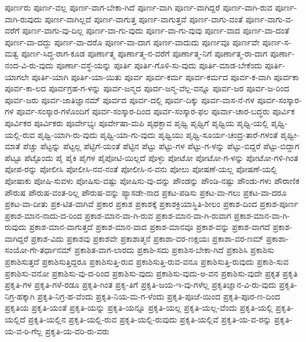 {ಪೂರ್ಣರು
ಪೂರ್ಣ-ವಲ್ಲ
ಪೂರ್ಣ-ವಾಗ-ಬೇಕಾ-ಗಿದೆ
ಪೂರ್ಣ-ವಾಗಿ
ಪೂರ್ಣ-ವಾಗಿದ್ದರೆ
ಪೂರ್ಣ-ವಾಗಿ-ರುವ
ಪೂರ್ಣ-ವಾಗಿ-ರುವುದು
ಪೂರ್ಣ-ವಾಗಿಲ್ಲದೆ
ಪೂರ್ಣ-ವಾಗುತ್ತ
ಪೂರ್ಣ-ವಾಗುತ್ತವೆ
ಪೂರ್ಣ-ವಾಗು-ವಂತೆ
ಪೂರ್ಣ-ವಾಗು-ವ-ವರೆಗೆ
ಪೂರ್ಣ-ವಾಗು-ವು-ದಿಲ್ಲ
ಪೂರ್ಣ-ವಾ-ಗು-ವುದು
ಪೂರ್ಣ-ವಾ-ಗು-ವುವು
ಪೂರ್ಣ-ವಾದ
ಪೂರ್ಣ-ವಾ-ದಂತೆ
ಪೂರ್ಣ-ವಾ-ದದ್ದು
ಪೂರ್ಣ-ವಾ-ದರೊ
ಪೂರ್ಣ-ವಾ-ದಾಗ
ಪೂರ್ಣ-ವಾದುದು
ಪೂರ್ಣವೂ
ಪೂರ್ಣವೇ
ಪೂರ್ಣ-ಸ-ಮತ್ವ
ಪೂರ್ಣ-ಸಿದ್ಧ-ರಾಗ-ಕೂಡ
ಪೂರ್ಣಾತ್ಮ
ಪೂರ್ಣಾತ್ಮ-ನ-ವರೆಗೆ
ಪೂರ್ಣಾತ್ಮ-ನಿಗೆ
ಪೂರ್ಣಾತ್ಮ-ರಾ-ದಾಗ
ಪೂರ್ಣಾ-ನಂದ-ವಿ-ರು-ವುದು
ಪೂರ್ಣಾ-ವಸ್ಥೆ-ಯನ್ನು
ಪೂರ್ತಿ
ಪೂರ್ತಿ-ಗೊಳಿ-ಸು-ವುದು
ಪೂರ್ತಿ-ಮಾಡ-ಬೇಕೆಂದು
ಪೂರ್ತಿ-ಯಾಗಲೇ
ಪೂರ್ತಿ-ಯಾಗಿ
ಪೂರ್ತಿ-ಯಾ-ಯಿತು
ಪೂರ್ವ
ಪೂರ್ವ-ಕರ್ಮ
ಪೂರ್ವ-ಕರ್ಮದ
ಪೂರ್ವ-ಕ-ವಾಗಿ
ಪೂರ್ವಕಾ
ಪೂರ್ವ-ಕಾ-ಲದ
ಪೂರ್ವಗ್ರಹ-ಗ-ಳನ್ನು
ಪೂರ್ವ-ಜನ್ಮದ
ಪೂರ್ವ-ಜನ್ಮ-ವೆಲ್ಲ-ವನ್ನೂ
ಪೂರ್ವ-ಜರ
ಪೂರ್ವ-ಜ-ರಿಂದ
ಪೂರ್ವ-ಜರು
ಪೂರ್ವ-ಜಾತಿಜ್ಞಾನಮ್
ಪೂರ್ವದ
ಪೂರ್ವ-ದಲ್ಲಿ
ಪೂರ್ವ-ದಿಕ್ಕು
ಪೂರ್ವ-ವಾಸ-ನೆ-ಗಳ
ಪೂರ್ವ-ಸಂಸ್ಕಾರ-ಗಳ
ಪೂರ್ವ-ಸಂಸ್ಕಾರ-ಗಳೊಂದಿಗೆ
ಪೂರ್ವ-ಸಂಸ್ಕಾರ-ದಿಂದ
ಪೂರ್ವ-ಸಂಸ್ಕಾರ-ಫಲ
ಪೂರ್ವಾ-ಚಾರ-ಬದ್ಧರು
ಪೂರ್ವಿಕ
ಪೂರ್ವಿಕರ
ಪೂರ್ವಿಕರು
ಪೂರ್ವೇಭ್ಯಃ
ಪೂರ್ವೇಷಾ-ಮಪಿ
ಪೃಥಕ್ಭಾವ
ಪೃಥ್ವಿ
ಪೃಥ್ವಿಗೆ
ಪೃಥ್ವಿಯ
ಪೃಥ್ವಿ-ಯಲ್ಲಿ
ಪೃಥ್ವಿ-ಯಲ್ಲಿ-ರುವ
ಪೃಥ್ವಿ-ಯಾಗಿ-ರು-ವುದು
ಪೃಥ್ವಿ-ಯಾ-ಗು-ವುದು
ಪೃಥ್ವಿಯು
ಪೃಥ್ವಿ-ಸೂರ್ಯ-ಚಂದ್ರ-ತಾರೆ-ಗಳಂತೆ
ಪೃಥ್ವೀ-ಮಾತೆ
ಪೆಚ್ಚು
ಪೆಟ್ಟನ್ನು
ಪೆಟ್ಟಲ್ಲ
ಪೆಟ್ಟಿಗೆ-ಯಂತೆ
ಪೆಟ್ಟಿನ
ಪೆಟ್ಟು
ಪೆಟ್ಟು-ಗಳ
ಪೆಟ್ಟು-ಗ-ಳನ್ನು
ಪೆಟ್ಟು-ಬಿದ್ದರೆ
ಪೆಟ್ಟು-ಬಿದ್ದಾಗ
ಪೆಟ್ಟೂ
ಪೆಟ್ಟೊಂದು
ಪೈ
ಪೈಕಿ
ಪೈಗಳ
ಪೈಪೋಟಿ-ಯಿಲ್ಲದೆ
ಪೊಳ್ಳು
ಪೋಟೋ
ಪೋಟೋ-ಗ-ಳನ್ನು
ಪೋಟೋ-ಗಳಿ-ಗಿಂತ
ಪೋಪ-ರನ್ನು
ಪೋಲೀಸಿ
ಪೋಲೀಸಿ-ನವ-ನಂತೆ
ಪೋಲೀಸಿ-ನ-ವನು
ಪೋಲು
ಪೋಷಣೆ-ಯಲ್ಲ
ಪೋಷಣೆ-ಯಲ್ಲಿ
ಪೋಷಾಕು
ಪೋಷಿ-ಸುವಳು
ಪೋಷಿಸು-ವಷ್ಟು
ಪೋಷಿಸು-ವು-ದನ್ನು
ಪೌಂಡನ್ನು
ಪೌಂಡಿ-ನಷ್ಟು
ಪೌಂಡು-ಗಳು
ಪೌರಾಣಿಕ
ಪೌರುಷ
ಪೌರುಷ-ವಂತ-ರಿಲ್ಲ
ಪೌರುಷ-ವನ್ನು
ಪ್ಯಾಸಡೇ-ನಾದ
ಪ್ರಕಟ-ಪಡಿಸು
ಪ್ರಕಟ-ವಾ-ಗಲು
ಪ್ರಕಟ-ವಾ-ದರೂ
ಪ್ರಕಟ-ವಾ-ದೀತು
ಪ್ರಕ-ಟಿತ-ವಾಗಿವೆ
ಪ್ರಕಾರ
ಪ್ರಕಾಶ
ಪ್ರಕಾಶಕ್ಕೆ
ಪ್ರಕಾಶಕ್ರಿಯಾಸ್ಥಿತಿ-ಶೀಲಂ
ಪ್ರಕಾಶ-ದಿಂದ
ಪ್ರಕಾಶ-ಪೂರ್ಣ
ಪ್ರಕಾಶ-ಮಾನ-ನಾದು-ದ-ರಿಂದ
ಪ್ರಕಾಶ-ಮಾನ-ವಾ-ಗಿ-ರುವ
ಪ್ರಕಾಶ-ಮಾನ-ವಾ-ಗಿ-ರುವಾಗ
ಪ್ರಕಾಶ-ಮಾನ-ವಾ-ಗಿ-ರುವುದು
ಪ್ರಕಾಶ-ಮಾನ-ವಾಗುತ್ತದೆ
ಪ್ರಕಾಶ-ಮಾನ-ವಾದ
ಪ್ರಕಾಶ-ಮಾನವೂ
ಪ್ರಕಾಶ-ವನ್ನು
ಪ್ರಕಾಶ-ವಾಗದೆ
ಪ್ರಕಾಶ-ವಾಗಿದ್ದರೆ
ಪ್ರಕಾಶ-ವಿದು
ಪ್ರಕಾಶವು
ಪ್ರಕಾಶವೇ
ಪ್ರಕಾಶಾತ್ಮನೆ
ಪ್ರಕಾಶಾ-ವರ-ಣಕ್ಷಯಃ
ಪ್ರಕಾಶಾ-ವರ-ಣಮ್
ಪ್ರಕಾಶಾ-ಸಂಯೋ-ಗೇ-ತರ್ಧಾನಮ್
ಪ್ರಕಾಶಿತ-ವಾಗ-ಲಾರದು
ಪ್ರಕಾಶಿ-ಸದು
ಪ್ರಕಾಶಿಸ-ಬೇಕಾ-ಗಿದೆ
ಪ್ರಕಾಶಿಸಿ
ಪ್ರಕಾಶಿಸು
ಪ್ರಕಾಶಿಸುತ್ತದೆ
ಪ್ರಕಾಶಿಸುತ್ತಿದ್ದರೂ
ಪ್ರಕಾಶಿಸುತ್ತಿ-ರುವ
ಪ್ರಕಾಶಿಸುತ್ತಿ-ರುವ-ವನೂ
ಪ್ರಕಾಶಿಸುತ್ತಿ-ರುವುದು
ಪ್ರಕಾಶಿ-ಸುವ
ಪ್ರಕಾಶಿಸು-ವನೋ
ಪ್ರಕಾಶಿಸು-ವು-ದ-ರಿಂದ
ಪ್ರಕಾಶಿಸು-ವುದು
ಪ್ರಕಾಶಿಸು-ವುದು-ಅ-ವನ
ಪ್ರಕಾಶಿಸು-ವುದೇ
ಪ್ರಕೃತ
ಪ್ರಕೃತಿ
ಪ್ರಕೃತಿ-ಗಳ
ಪ್ರಕೃತಿ-ಗಳೆ-ರಡೂ
ಪ್ರಕೃತಿ-ಗಿಂತ
ಪ್ರಕೃ-ತಿಗೆ
ಪ್ರಕೃತಿ-ಜಯ-ಇ-ವು-ಗಳೆಲ್ಲ
ಪ್ರಕೃತಿಜ್ಞಾನ-ವಿ-ರು-ವುದು
ಪ್ರಕೃತಿ-ನಿಗ್ರ-ಹಕ್ಕಾಗಿ
ಪ್ರಕೃತಿ-ನಿಗ್ರ-ಹ-ವೆಂದು
ಪ್ರಕೃತಿ-ನಿಯ-ಮ-ಗ-ಳೆಂದು
ಪ್ರಕೃತಿ-ಪೂಜೆ-ಯಿಂದ
ಪ್ರಕೃತಿ-ಪೂರ-ಣ-ದಿಂದ
ಪ್ರಕೃತಿಯ
ಪ್ರಕೃತಿ-ಯಂತೆ
ಪ್ರಕೃತಿ-ಯನ್ನು
ಪ್ರಕೃತಿ-ಯನ್ನೂ
ಪ್ರಕೃತಿ-ಯಲ್ಲ
ಪ್ರಕೃತಿ-ಯಲ್ಲ-ವೆಂದು
ಪ್ರಕೃತಿ-ಯಲ್ಲಿ
ಪ್ರಕೃತಿ-ಯಲ್ಲಿದೆ
ಪ್ರಕೃತಿ-ಯಲ್ಲಿನ
ಪ್ರಕೃತಿ-ಯಲ್ಲಿ-ರುವ
ಪ್ರಕೃತಿ-ಯಲ್ಲಿ-ರುವುದು
ಪ್ರಕೃತಿ-ಯಲ್ಲಿವೆ
ಪ್ರಕೃತಿ-ಯ-ವ-ರನ್ನು
ಪ್ರಕೃತಿ-ಯ-ವ-ರಿ-ಗೆಲ್ಲ
ಪ್ರಕೃತಿ-ಯ-ವರಿ-ರು-ವರು
}
